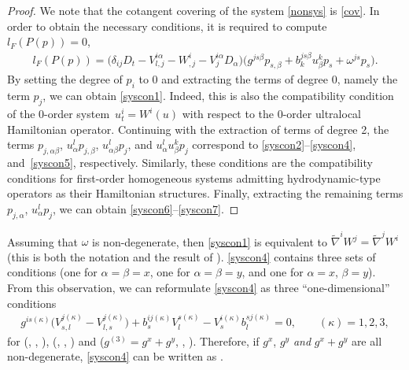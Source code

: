 \documentclass[10pt,a4paper]{amsart}
\numberwithin{equation}{section}
\begin{document}
\begin{proof}
We note that the cotangent covering of the system \eqref{nonsys} is \eqref{cov}. In order to obtain the necessary conditions, it is required to compute $l_F(P(p))=0$,
\begin{gather*}
l_F(P(p))=\big(\delta_{ij}D_t-V^{i\alpha}_{l,j}-W^i_{,j}-V^{i\alpha}_jD_\alpha\big)\big(g^{js\beta}p_{s,\beta}+b^{js\beta}_ku^k_\beta p_s+\omega^{js}p_s\big).
\end{gather*}
By setting the degree of $p_i$ to 0 and extracting the terms of degree 0, namely the term $p_j$, we can obtain \eqref{syscon1}. Indeed, this is also the compatibility condition of the 0-order system~${u^i_t=W^i(u)}$ with respect to the 0-order ultralocal Hamiltonian operator. Continuing with the extraction of terms of degree 2, the terms $p_{j,\alpha\beta}$, $u^l_\alpha p_{j,\beta}$, $u^l_{\alpha\beta} p_j$, and $u^l_\alpha u^k_\beta p_j$ correspond to \eqref{syscon2}--\eqref{syscon4}, and~\eqref{syscon5}, respectively. Similarly, these conditions are the compatibility conditions for first-order homogeneous systems admitting hydrodynamic-type operators as their Hamiltonian structures. Finally, extracting the remaining terms $p_{j,\alpha}$, $u^l_\alpha p_j$, we can obtain \eqref{syscon6}--\eqref{syscon7}.
\end{proof}

\begin{Remark}
Assuming that $\omega$ is non-degenerate, then \eqref{syscon1} is equivalent to $\tilde{\nabla}^iW^j=\tilde{\nabla}^jW^i$ (this is both the notation and the result of \cite{vergallo2023non}). \eqref{syscon4} contains three sets of conditions (one for $\alpha=\beta=x$, one for $\alpha=\beta=y$, and one for $\alpha=x$, $\beta=y$). From this observation, we can reformulate \eqref{syscon4} as three ``one-dimensional'' conditions
\begin{gather*}
g^{is(\kappa)}\big(V^{j(\kappa)}_{s,l}-V^{j(\kappa)}_{l,s}\big)+b^{ij(\kappa)}_sV^{s(\kappa)}_l-V^{i(\kappa)}_sb^{sj(\kappa)}_l=0,\qquad(\kappa)=1,2,3,
\end{gather*}
for \big(, , \big), \big(, , \big) and \big($g^{(3)}=g^x+g^y$, , \big). Therefore, if $g^x$, $g^y$ \emph{and} $g^x+g^y$ are all non-degenerate, \eqref{syscon4} can be written as .
\end{Remark}
\end{document}
